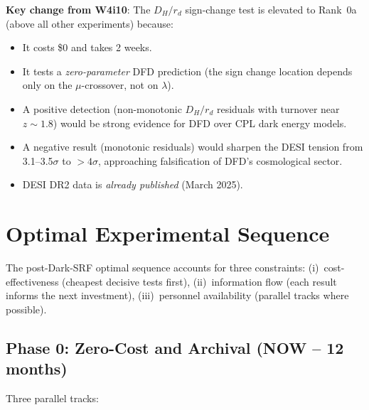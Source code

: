 \documentclass[11pt]{article}
\begin{document}
\textbf{Key change from W4i10}: The $D_H/r_d$ sign-change test is
elevated to Rank~0a (above all other experiments) because:
\begin{itemize}[nosep]
\item It costs \$0 and takes 2 weeks.
\item It tests a \emph{zero-parameter} DFD prediction (the sign change
  location depends only on the $\mu$-crossover, not on $\lambda$).
\item A positive detection (non-monotonic $D_H/r_d$ residuals with
  turnover near $z \sim 1.8$) would be strong evidence for DFD over
  CPL dark energy models.
\item A negative result (monotonic residuals) would sharpen the DESI
  tension from 3.1--3.5$\sigma$ to $>4\sigma$, approaching falsification
  of DFD's cosmological sector.
\item DESI DR2 data is \emph{already published} (March 2025).
\end{itemize}


\section{Optimal Experimental Sequence}
\label{sec:sequence}

The post-Dark-SRF optimal sequence accounts for three constraints:
(i)~cost-effectiveness (cheapest decisive tests first),
(ii)~information flow (each result informs the next investment),
(iii)~personnel availability (parallel tracks where possible).

\subsection{Phase 0: Zero-Cost and Archival (NOW -- 12 months)}

Three parallel tracks:
\end{document}
